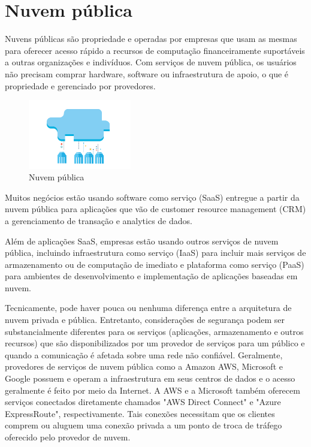 \section{Nuvem pública}

Nuvens públicas são propriedade e operadas por empresas que usam as mesmas para
oferecer acesso rápido a recursos de computação financeiramente suportáveis a outras
organizações e indivíduos. Com serviços de nuvem pública, os usuários não precisam
comprar hardware, software ou infraestrutura de apoio, o que é propriedade e
gerenciado por provedores.

\begin{figure}[ht]
    \centering
    \includegraphics[width=0.4\textwidth]{img/public.png}
    \caption{Nuvem pública}
    \label{img:publiccloud}
\end{figure}

Muitos negócios estão usando software como serviço (SaaS) entregue a partir da nuvem
pública para aplicações que vão de customer resource management (CRM) a
gerenciamento de transação e analytics de dados.

Além de aplicações SaaS, empresas estão usando outros serviços de nuvem pública,
incluindo infraestrutura como serviço (IaaS) para incluir mais serviços de
armazenamento ou de computação de imediato e plataforma como serviço (PaaS)
para ambientes de desenvolvimento e implementação de aplicações baseadas em nuvem.

Tecnicamente, pode haver pouca ou nenhuma diferença entre a arquitetura de nuvem
privada e pública. Entretanto, considerações de segurança podem ser substancialmente
diferentes para os serviços (aplicações, armazenamento e outros recursos) que são
disponibilizados por um provedor de serviços para um público e quando a comunicação
é afetada sobre uma rede não confiável. Geralmente, provedores de serviços de nuvem
pública como a Amazon AWS, Microsoft e Google possuem e operam a infraestrutura em
seus centros de dados e o acesso geralmente é feito por meio da Internet. A AWS e a
Microsoft também oferecem serviços conectados diretamente chamados
"AWS Direct Connect" e "Azure ExpressRoute", respectivamente. Tais conexões
necessitam que os clientes comprem ou aluguem uma conexão privada a um ponto de
troca de tráfego oferecido pelo provedor de nuvem.

